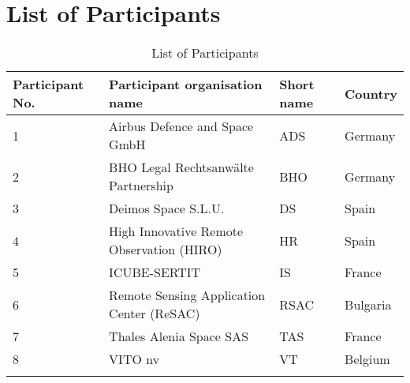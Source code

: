 \chapter{List of Participants}

\begin{longtable}[H]{p{2cm} p{8cm} p{1.5cm} p{1.8cm}}
	
	\toprule[2pt]
	
	\textbf{Participant No.} & \textbf{Participant organisation name} & \textbf{Short name} & \textbf{Country} \\
	
	\midrule[1.5pt] 
	\endhead
	
	1 & Airbus Defence and Space GmbH & ADS & Germany \vspace{0.2cm} \\
	
	\midrule

	2 & BHO Legal Rechtsanwälte Partnership & BHO & Germany \vspace{0.2cm} \\
	
	\midrule
	
	3 &  Deimos Space S.L.U. & DS & Spain \vspace{0.2cm} \\

	\midrule

 	4 & High Innovative Remote Observation (HIRO) & HR & Spain \vspace{0.2cm} \\
 	
 	\midrule
 	
 	5 & ICUBE-SERTIT & IS & France \vspace{0.2cm} \\
 	
 	\midrule
 	
 	6 & Remote Sensing Application Center (ReSAC) & RSAC & Bulgaria \vspace{0.2cm} \\
 	
 	\midrule
 	
 	7 & Thales Alenia Space SAS & TAS & France \vspace{0.2cm} \\
 	
 	\midrule
 	
 	8 & VITO nv & VT & Belgium \vspace{0.2cm} \\
	
	\bottomrule[2pt]
	
	\caption{List of Participants}
	\label{Participants}
\end{longtable}